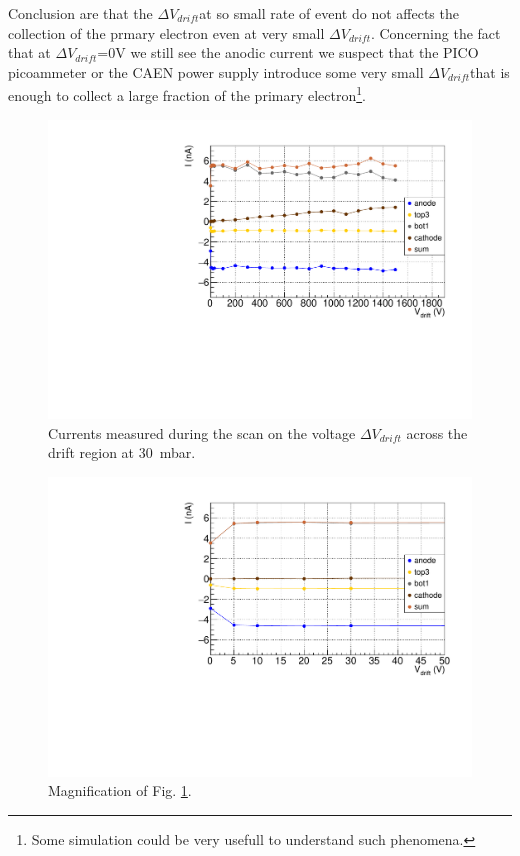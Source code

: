 \documentclass[a4paper, 11 pt]{report}
\newcommand{\Vdrift}{$ \Delta V_{drift}$}
\begin{document}
Conclusion are that the \Vdrift at so small rate of event do not affects the collection of the
prmary electron even at very small \Vdrift. Concerning the fact that at \Vdrift=0V we still
see the anodic current we suspect that the PICO picoammeter or the CAEN power supply
introduce some very small \Vdrift that is enough to collect a large fraction of the primary
electron\footnote{Some simulation could be very usefull to understand such phenomena.}.
\begin{figure}[htbp]
	\centering
	\includegraphics[width=\textwidth]{Immagini/driftScan_FULL_30mbar_r40-60.pdf}
	\caption{Currents measured during the scan on the voltage \Vdrift{} across the drift region at 30~mbar.}
	\label{fig:drift_FULLTHGEM_30mbar}
\end{figure}
\begin{figure}[htbp]
	\centering
	\includegraphics[width=\textwidth]{Immagini/driftScan_FULL_30mbar_r40-60_zoom1.pdf}
	\caption{Magnification of Fig. \ref{fig:drift_FULLTHGEM_30mbar}.}
	\label{fig:drift_FULLTHGEM_30mbar_mag}
\end{figure}
\end{document}
